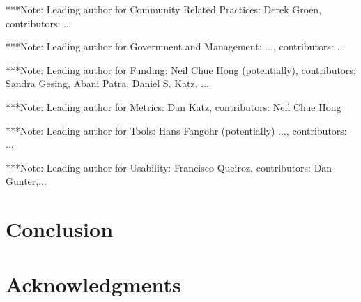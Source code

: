\documentclass[11pt, oneside]{amsart}
\newcommand{\note}[1]{ {\textcolor{blueish}    { ***Note:      #1 }}}
\begin{document}
\note{Leading author for Community Related Practices: Derek Groen, contributors: ...}


\note{Leading author for Government and Management: ..., contributors: ...}


\note{Leading author for Funding: Neil Chue Hong (potentially), contributors: Sandra Gesing, Abani Patra, Daniel S. Katz, ...}


\note{Leading author for Metrics: Dan Katz, contributors: Neil Chue Hong}
 

\note{Leading author for Tools: Hans Fangohr (potentially) ..., contributors: ...}


\note{Leading author for Usability: Francisco Queiroz, contributors: Dan Gunter,...}


\section{Conclusion} \label{sec:conclusion}

\section*{Acknowledgments} \label{sec:acks}






\end{document}
